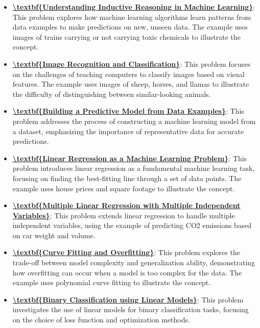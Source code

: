 \documentclass{article}%
\begin{document}
\begin{itemize}[leftmargin=*]%
\item \href{https://www.math.purdue.edu/~yipn/351/05L2-ML Basics.pdf#page=3}{\textbf{\textbackslash{}textbf\{Understanding Inductive Reasoning in Machine Learning\}}}: This problem explores how machine learning algorithms learn patterns from data examples to make predictions on new, unseen data. The example uses images of trains carrying or not carrying toxic chemicals to illustrate the concept.%
\item \href{https://www.math.purdue.edu/~yipn/351/05L2-ML Basics.pdf#page=4}{\textbf{\textbackslash{}textbf\{Image Recognition and Classification\}}}: This problem focuses on the challenges of teaching computers to classify images based on visual features. The example uses images of sheep, horses, and llamas to illustrate the difficulty of distinguishing between similar-looking animals.%
\item \href{https://www.math.purdue.edu/~yipn/351/05L2-ML Basics.pdf#page=5}{\textbf{\textbackslash{}textbf\{Building a Predictive Model from Data Examples\}}}: This problem addresses the process of constructing a machine learning model from a dataset, emphasizing the importance of representative data for accurate predictions.%
\item \href{https://www.math.purdue.edu/~yipn/351/05L2-ML Basics.pdf#page=6}{\textbf{\textbackslash{}textbf\{Linear Regression as a Machine Learning Problem\}}}: This problem introduces linear regression as a fundamental machine learning task, focusing on finding the best-fitting line through a set of data points. The example uses house prices and square footage to illustrate the concept.%
\item \href{https://www.math.purdue.edu/~yipn/351/05L2-ML Basics.pdf#page=11}{\textbf{\textbackslash{}textbf\{Multiple Linear Regression with Multiple Independent Variables\}}}: This problem extends linear regression to handle multiple independent variables, using the example of predicting CO2 emissions based on car weight and volume.%
\item \href{https://www.math.purdue.edu/~yipn/351/05L2-ML Basics.pdf#page=13}{\textbf{\textbackslash{}textbf\{Curve Fitting and Overfitting\}}}: This problem explores the trade-off between model complexity and generalization ability, demonstrating how overfitting can occur when a model is too complex for the data. The example uses polynomial curve fitting to illustrate the concept.%
\item \href{https://www.math.purdue.edu/~yipn/351/05L2-ML Basics.pdf#page=20}{\textbf{\textbackslash{}textbf\{Binary Classification using Linear Models\}}}: This problem investigates the use of linear models for binary classification tasks, focusing on the choice of loss function and optimization methods.%
\end{itemize}%
\end{document}

